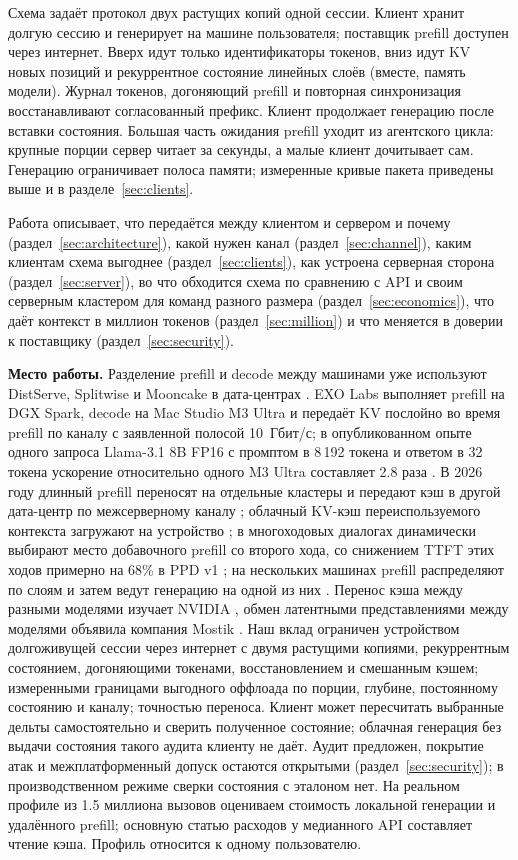 Схема задаёт протокол двух растущих копий одной сессии. Клиент хранит долгую сессию и генерирует на машине
пользователя; поставщик prefill доступен через интернет. Вверх идут только идентификаторы токенов,
вниз идут KV новых позиций и рекуррентное состояние линейных слоёв (вместе, память модели).
Журнал токенов, догоняющий prefill и повторная синхронизация восстанавливают согласованный префикс.
Клиент продолжает генерацию после вставки состояния. Большая часть ожидания prefill уходит из агентского цикла: крупные порции сервер читает за секунды, а малые
клиент дочитывает сам. Генерацию ограничивает полоса памяти; измеренные кривые пакета приведены выше и в разделе~\ref{sec:clients}.

Работа описывает, что передаётся между клиентом и сервером и почему (раздел~\ref{sec:architecture}), какой
нужен канал (раздел~\ref{sec:channel}), каким клиентам схема выгоднее (раздел~\ref{sec:clients}), как устроена
серверная сторона (раздел~\ref{sec:server}), во что обходится схема по сравнению с API и своим серверным кластером для
команд разного размера (раздел~\ref{sec:economics}), что даёт контекст в миллион токенов
(раздел~\ref{sec:million}) и что меняется в доверии к поставщику (раздел~\ref{sec:security}).

\textbf{Место работы.} Разделение prefill и decode между машинами уже используют DistServe, Splitwise и Mooncake
в дата-центрах \cite{zhong2024distserve,patel2023splitwise,qin2024mooncake}.
EXO Labs выполняет prefill на DGX Spark, decode на Mac Studio M3 Ultra и передаёт KV послойно во время prefill
по каналу с заявленной полосой 10~Гбит/с; в опубликованном опыте одного запроса Llama-3.1 8B FP16 с промптом в 8\,192 токена и ответом в 32 токена
ускорение относительно одного M3 Ultra составляет 2.8 раза \cite{exolabsSpark}.
В 2026 году длинный prefill переносят на отдельные кластеры и передают кэш в другой дата-центр по межсерверному каналу \cite{qin2026prfaas};
облачный KV-кэш переиспользуемого контекста загружают на устройство \cite{liu2026sparkv}; в многоходовых диалогах
динамически выбирают место добавочного prefill со второго хода, со снижением TTFT этих ходов примерно на 68\% в PPD v1 \cite{li2026ppd}; на нескольких машинах prefill распределяют по слоям и затем ведут генерацию на одной из них \cite{ds4pr401}. Перенос кэша между разными моделями изучает NVIDIA \cite{heo2026crossmodel}, обмен латентными
представлениями между моделями объявила компания Mostik \cite{mostik2026}. Наш вклад ограничен устройством долгоживущей сессии через интернет с двумя растущими копиями,
рекуррентным состоянием, догоняющими токенами, восстановлением и смешанным кэшем;
измеренными границами выгодного оффлоада по порции, глубине, постоянному состоянию и каналу; точностью переноса.
Клиент может пересчитать выбранные дельты самостоятельно и сверить полученное состояние; облачная генерация
без выдачи состояния такого аудита клиенту не даёт. Аудит предложен, покрытие атак и межплатформенный допуск
остаются открытыми (раздел~\ref{sec:security}); в производственном режиме сверки состояния с эталоном нет. На реальном профиле из 1.5 миллиона вызовов оцениваем
стоимость локальной генерации и удалённого prefill; основную статью расходов у медианного API составляет чтение кэша.
Профиль относится к одному пользователю.

